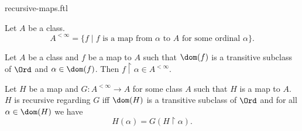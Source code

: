 \documentclass{naproche-library}
\begin{document}
\begin{smodule}[title=Recursive Maps]{recursive-maps.ftl}

\begin{definition}[forthel,id=SET_THEORY_04_1955917673267200]
  Let $A$ be a class.
  \[ A^{< \infty} = \{f \mid \text{$f$ is a map from $\alpha$ to $A$ for some ordinal $\alpha$} \}. \]
\end{definition}

\begin{proposition}[forthel,id=SET_THEORY_04_7841726894964736]
  Let $A$ be a class and $f$ be a map to $A$ such that $\dom(f)$ is a transitive subclass of $\Ord$ and $\alpha \in \dom(f)$.
  Then $f \restriction \alpha \in A^{< \infty}$.
\end{proposition}


\begin{definition}[forthel,id=SET_THEORY_04_5597213870784512]
  Let $H$ be a map and $G : A^{< \infty} \to A$ for some class $A$ such that $H$ is a map to $A$.
  $H$ is recursive regarding $G$ iff $\dom(H)$ is a transitive subclass of $\Ord$ and for all $\alpha \in \dom(H)$ we have \[ H(\alpha) = G(H \restriction \alpha). \]
\end{definition}

\end{smodule}
\end{document}
